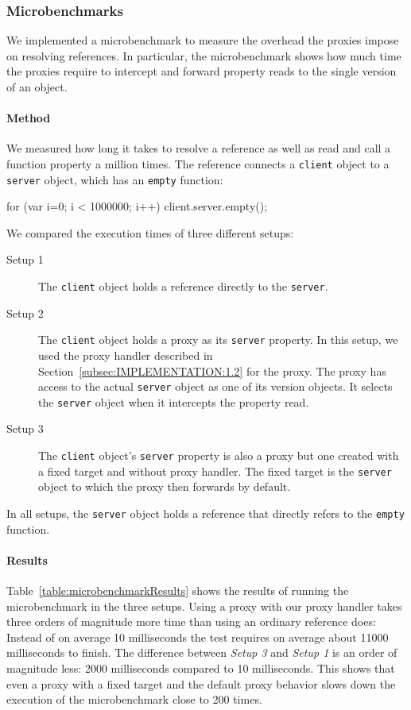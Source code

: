 \subsubsection{Microbenchmarks}

We implemented a microbenchmark to measure the overhead the proxies
impose on resolving references.  In particular, the microbenchmark
shows how much time the proxies require to intercept and forward
property reads to the single version of an object.

\paragraph{Method}
We measured how long it takes to resolve a reference as well as read
and call a function property a million times.  The reference connects
a \lstinline{client} object to a \lstinline{server} object, which has
an \lstinline{empty} function:

\begin{code}
for (var i=0; i < 1000000; i++) {
    client.server.empty();
} 
\end{code}

We compared the execution times of three different setups:

\begin{description}
\item[Setup 1] The \lstinline{client} object holds a reference
  directly to the \lstinline{server}.
    \item[Setup 2] The \lstinline{client} object holds a proxy as its
      \lstinline{server} property. In this setup, we used the proxy
      handler described in Section~\ref{subsec:IMPLEMENTATION:1.2} for
      the proxy. The proxy has access to the actual \lstinline{server}
      object as one of its version objects. It selects the
      \lstinline{server} object when it intercepts the property read.
    \item[Setup 3] The \lstinline{client} object's \lstinline{server}
      property is also a proxy but one created with a fixed target and
      without proxy handler. The fixed target is the
      \lstinline{server} object to which the proxy then forwards by
      default.
\end{description}

In all setups, the \lstinline{server} object holds a reference that
directly refers to the \lstinline{empty} function.


\paragraph{Results}
Table~\ref{table:microbenchmarkResults} shows the results of running
the microbenchmark in the three setups.  Using a proxy with our proxy
handler takes three orders of magnitude more time than using an
ordinary reference does: Instead of on average 10 milliseconds the
test requires on average about 11000 milliseconds to finish.  The
difference between \emph{Setup 3} and \emph{Setup 1} is an order of
magnitude less: 2000 milliseconds compared to 10 milliseconds.  This
shows that even a proxy with a fixed target and the default proxy
behavior slows down the execution of the microbenchmark close to 200
times.

